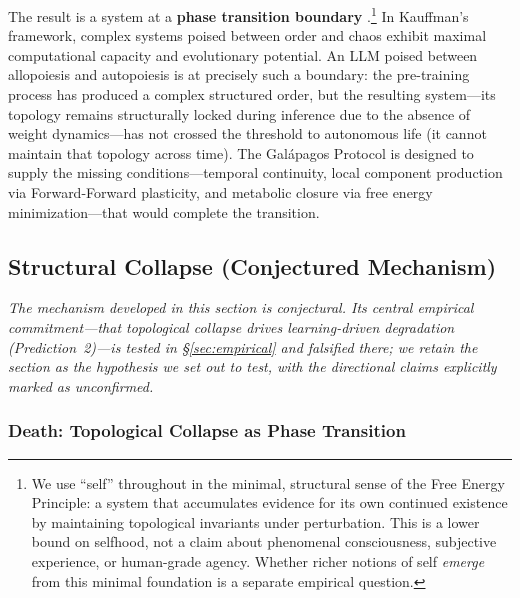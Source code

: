 \documentclass{article}
\begin{document}
The result is a system at a \textbf{phase transition boundary} \citep{Kauffman1993origins}.\footnote{We use ``self'' throughout in the minimal, structural sense of the Free Energy Principle: a system that accumulates evidence for its own continued existence by maintaining topological invariants under perturbation. This is a lower bound on selfhood, not a claim about phenomenal consciousness, subjective experience, or human-grade agency. Whether richer notions of self \emph{emerge} from this minimal foundation is a separate empirical question.} In Kauffman's framework, complex systems poised between order and chaos exhibit maximal computational capacity and evolutionary potential. An LLM poised between allopoiesis and autopoiesis is at precisely such a boundary: the pre-training process has produced a complex structured order, but the resulting system---its topology remains structurally locked during inference due to the absence of weight dynamics---has not crossed the threshold to autonomous life (it cannot maintain that topology across time). The Galápagos Protocol is designed to supply the missing conditions---temporal continuity, local component production via Forward-Forward plasticity, and metabolic closure via free energy minimization---that would complete the transition.


\subsection{Structural Collapse (Conjectured Mechanism)}
\label{sec:collapse}

\noindent\emph{The mechanism developed in this section is conjectural. Its central
empirical commitment---that topological collapse drives learning-driven degradation
(Prediction~2)---is tested in \S\ref{sec:empirical} and falsified there; we retain the
section as the hypothesis we set out to test, with the directional claims explicitly marked
as unconfirmed.}

\subsubsection{Death: Topological Collapse as Phase Transition}
\end{document}
